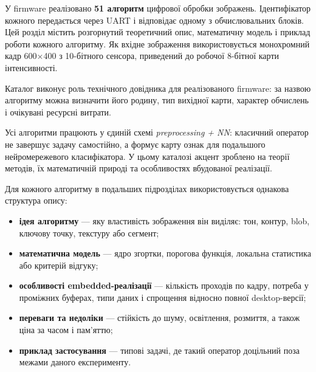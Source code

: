 \documentclass[a4paper,12pt]{article}
\begin{document}
У firmware реалізовано \textbf{51 алгоритм} цифрової обробки зображень. Ідентифікатор кожного передається через UART і відповідає одному з обчислювальних блоків. Цей розділ містить розгорнутий теоретичний опис, математичну модель і приклад роботи кожного алгоритму. Як вхідне зображення використовується монохромний кадр 600$\times$400 з 10-бітного сенсора, приведений до робочої 8-бітної карти інтенсивності.

Каталог виконує роль технічного довідника для реалізованого firmware: за назвою алгоритму можна визначити його родину, тип вихідної карти, характер обчислень і очікувані ресурсні витрати.

Усі алгоритми працюють у єдиній схемі \textit{preprocessing + NN}: класичний оператор не завершує задачу самостійно, а формує карту ознак для подальшого нейромережевого класифікатора. У цьому каталозі акцент зроблено на теорії методів, їх математичній природі та особливостях вбудованої реалізації.

Для кожного алгоритму в подальших підрозділах використовується однакова структура опису:
\begin{itemize}
	\item \textbf{ідея алгоритму} --- яку властивість зображення він виділяє: тон, контур, blob, ключову точку, текстуру або сегмент;
	\item \textbf{математична модель} --- ядро згортки, порогова функція, локальна статистика або критерій відгуку;
	\item \textbf{особливості embedded-реалізації} --- кількість проходів по кадру, потреба у проміжних буферах, типи даних і спрощення відносно повної desktop-версії;
	\item \textbf{переваги та недоліки} --- стійкість до шуму, освітлення, розмиття, а також ціна за часом і пам'яттю;
	\item \textbf{приклад застосування} --- типові задачі, де такий оператор доцільний поза межами даного експерименту.
\end{itemize}
\end{document}
